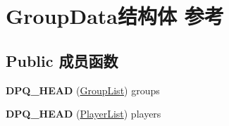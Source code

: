 \hypertarget{struct_group_data}{}\section{Group\+Data结构体 参考}
\label{struct_group_data}
\subsection*{Public 成员函数}
\begin{DoxyCompactItemize}
\item 
\mbox{\label{struct_group_data_af733ab3ed0f8baba109211ca89fe2eb0}} 
{\bfseries D\+P\+Q\+\_\+\+H\+E\+AD} (\hyperlink{struct_group_list}{Group\+List}) groups
\item 
\mbox{\label{struct_group_data_a5ae550362e3bef6866d0a94ad64cdb80}} 
{\bfseries D\+P\+Q\+\_\+\+H\+E\+AD} (\hyperlink{struct_player_list}{Player\+List}) players
\end{DoxyCompactItemize}
